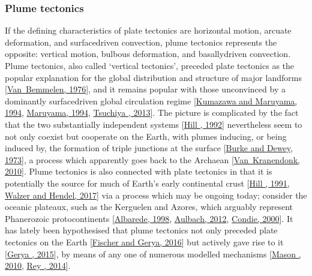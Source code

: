 \documentclass[letterpaper,10pt,english]{jupyterBook}
\begin{document}
\subsubsection{Plume tectonics}
\label{\detokenize{content/chapter_01_background/main:plume-tectonics}}
\sphinxAtStartPar
If the defining characteristics of plate tectonics are horizontal motion, arcuate deformation, and surface\sphinxhyphen{}driven convection, plume tectonics represents the opposite: vertical motion, bulbous deformation, and basally\sphinxhyphen{}driven convection. Plume tectonics, also called ‘vertical tectonics’, preceded plate tectonics as the popular explanation for the global distribution and structure of major landforms {[}\hyperlink{cite.references:id556}{Van Bemmelen, 1976}{]}, and it remains popular with those unconvinced by a dominantly surface\sphinxhyphen{}driven global circulation regime {[}\hyperlink{cite.references:id554}{Kumazawa and Maruyama, 1994}, \hyperlink{cite.references:id555}{Maruyama, 1994}, \hyperlink{cite.references:id183}{Tsuchiya , 2013}{]}. The picture is complicated by the fact that the two substantially independent systems {[}\hyperlink{cite.references:id558}{Hill , 1992}{]} nevertheless seem to not only co\sphinxhyphen{}exist but cooperate on the Earth, with plumes inducing, or being induced by, the formation of triple junctions at the surface {[}\hyperlink{cite.references:id551}{Burke and Dewey, 1973}{]}, a process which apparently goes back to the Archaean {[}\hyperlink{cite.references:id552}{Van Kranendonk, 2010}{]}. Plume tectonics is also connected with plate tectonics in that it is potentially the source for much of Earth’s early continental crust {[}\hyperlink{cite.references:id559}{Hill , 1991}, \hyperlink{cite.references:id320}{Walzer and Hendel, 2017}{]} via a process which may be ongoing today; consider the oceanic plateaux, such as the Kerguelen and Azores, which arguably represent Phanerozoic proto\sphinxhyphen{}continents {[}\hyperlink{cite.references:id289}{Albarede, 1998}, \hyperlink{cite.references:id70}{Aulbach, 2012}, \hyperlink{cite.references:id69}{Condie, 2000}{]}. It has lately been hypothesised that plume tectonics not only preceded plate tectonics on the Earth {[}\hyperlink{cite.references:id233}{Fischer and Gerya, 2016}{]} but actively gave rise to it {[}\hyperlink{cite.references:id553}{Gerya , 2015}{]}, by means of any one of numerous modelled mechanisms {[}\hyperlink{cite.references:id208}{Mason , 2010}, \hyperlink{cite.references:id399}{Rey , 2014}{]}.
\end{document}
